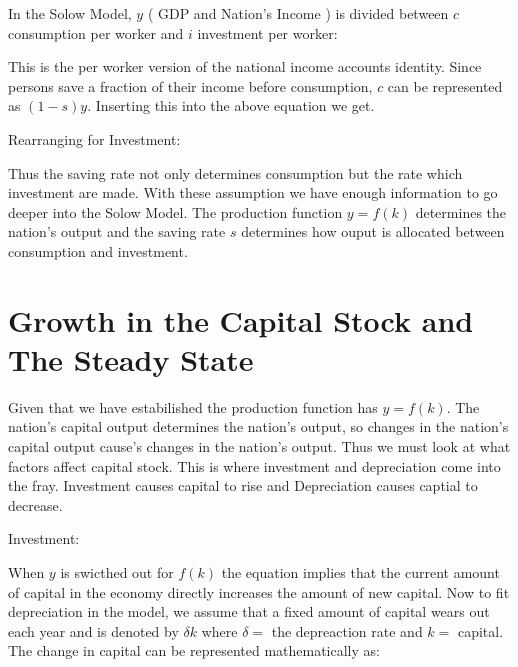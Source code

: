 
\noindent In the Solow Model, $y$ ( GDP and Nation's Income ) is divided between $c$ consumption per worker and $i$ investment per worker: 


\noindent This is the per worker version of the national income accounts identity. Since persons save a fraction of their income before consumption, $c$ can be represented as $(1-s)y$. Inserting this into the above equation we get. 


\noindent Rearranging for Investment: 


\noindent Thus the saving rate not only determines consumption but the rate which investment are made. With these assumption we have enough information 
to go deeper into the Solow Model. The production function $y = f(k)$ determines the nation's output and the saving rate $s$ determines how ouput is
allocated between consumption and investment. 

\section*{Growth in the Capital Stock and The Steady State} 


Given that we have estabilished the production function has $y = f(k)$. The nation's capital output determines the nation's output, so changes in the nation's capital output cause's changes in the nation's output. Thus we 
must look at what factors affect capital stock. This is where investment and depreciation come into the fray. Investment causes capital to rise and Depreciation causes captial to decrease. 

\noindent Investment: 


\noindent When $y$ is swicthed out for $f(k)$ the equation implies that the current amount of capital in the economy directly increases the amount of new capital. Now to fit depreciation in the model, we 
assume that a fixed amount of capital wears out each year and is denoted by $\delta{k}$ where $\delta =$ the depreaction rate and $k =$ capital. The change in capital can be represented mathematically as: 

